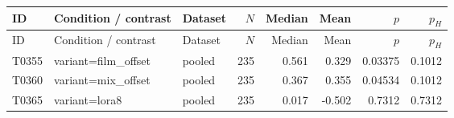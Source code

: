 \begin{longtable}{p{.45in}p{2.6in}p{.75in}rrrrr}
\toprule
ID & Condition / contrast & Dataset & $N$ & Median & Mean & $p$ & $p_H$ \\
\midrule
\endfirsthead
\toprule
ID & Condition / contrast & Dataset & $N$ & Median & Mean & $p$ & $p_H$ \\
\midrule
\endhead
T0355 & variant=film\_\allowbreak{}offset & pooled & 235 & 0.561 & 0.329 & 0.03375 & 0.1012 \\
T0360 & variant=mix\_\allowbreak{}offset & pooled & 235 & 0.367 & 0.355 & 0.04534 & 0.1012 \\
T0365 & variant=lora8 & pooled & 235 & 0.017 & -0.502 & 0.7312 & 0.7312 \\
\bottomrule
\end{longtable}
